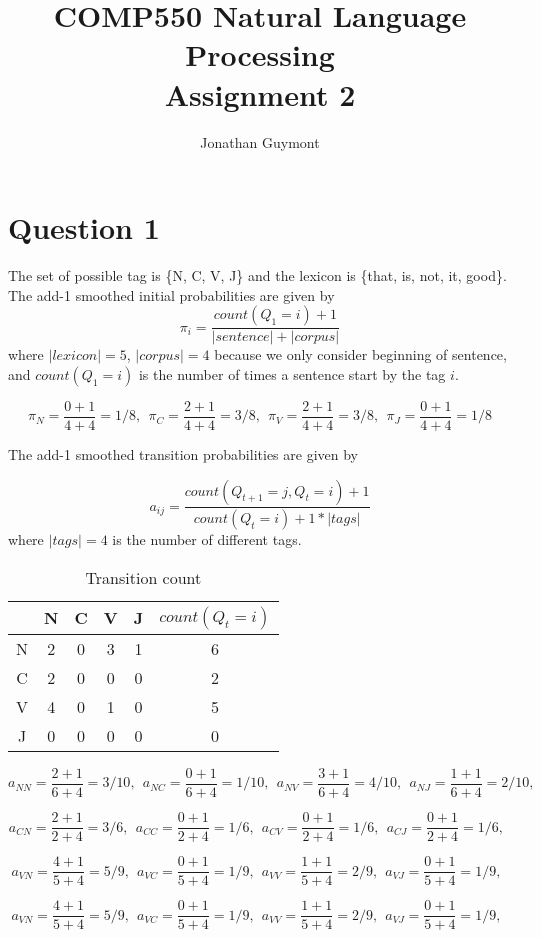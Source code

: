 \documentclass[10pt]{article}
\title{COMP550 Natural Language Processing\\Assignment 2}
\author{Jonathan Guymont}
\begin{document}
\maketitle

\section*{Question 1}

The set of possible tag is \{N, C, V, J\} and the lexicon is \{that, is, not, it, good\}. The add-1 smoothed initial probabilities are given by
\[
	\pi_i = \frac{count(Q_1=i) + 1}{|sentence| + |corpus|}
\]
where $|lexicon|=5$, $|corpus|=4$ because we only consider beginning of sentence, and $count(Q_1=i)$ is the number of times a sentence start by the tag $i$.

\[
	\pi_N = \frac{0 + 1}{4 + 4} = 1/8,~~
	\pi_C = \frac{2 + 1}{4 + 4} = 3/8,~~ 
	\pi_V = \frac{2 + 1}{4 + 4} = 3/8,~~ 
	\pi_J = \frac{0 + 1}{4 + 4} = 1/8 
\]

The add-1 smoothed transition probabilities are given by

\[
	a_{ij} = \frac{count(Q_{t+1}=j, Q_t=i)+1}{count(Q_t=i)+1*|tags|}
\]
where $|tags|=4$ is the number of different tags.
\begin{table}[h!]
	\centering
	\begin{tabular}{ c|c|c|c|c|c }
		  & N & C & V &	J & $count(Q_t=i)$ \\
		\hline
		N & 2 & 0 & 3 & 1 & 6 \\
		\hline
		C & 2 & 0 & 0 & 0 & 2 \\
		\hline
		V & 4 & 0 & 1 & 0 & 5 \\
		\hline
		J & 0 & 0 & 0 & 0 & 0 \\
		\hline
	\end{tabular}
	\caption{Transition count}
	\label{table:result}
\end{table}

\[
	a_{NN} = \frac{2+1}{6+4}=3/10,~~
	a_{NC} = \frac{0+1}{6+4}=1/10,~~
	a_{NV} = \frac{3+1}{6+4}=4/10,~~
	a_{NJ} = \frac{1+1}{6+4}=2/10,~~
\]

\[
	a_{CN} = \frac{2+1}{2+4}=3/6,~~
	a_{CC} = \frac{0+1}{2+4}=1/6,~~
	a_{CV} = \frac{0+1}{2+4}=1/6,~~
	a_{CJ} = \frac{0+1}{2+4}=1/6,~~
\]

\[
	a_{VN} = \frac{4+1}{5+4}=5/9,~~
	a_{VC} = \frac{0+1}{5+4}=1/9,~~
	a_{VV} = \frac{1+1}{5+4}=2/9,~~
	a_{VJ} = \frac{0+1}{5+4}=1/9,~~
\]

\[
	a_{VN} = \frac{4+1}{5+4}=5/9,~~
	a_{VC} = \frac{0+1}{5+4}=1/9,~~
	a_{VV} = \frac{1+1}{5+4}=2/9,~~
	a_{VJ} = \frac{0+1}{5+4}=1/9,~~
\]
\end{document}
